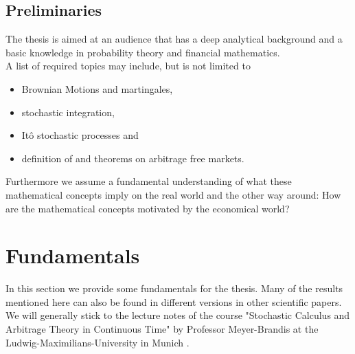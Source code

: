 \documentclass[12pt]{article}
\begin{document}
	
	\subsection{Preliminaries}
	The thesis is aimed at an audience that has a deep analytical background and a basic knowledge in probability theory and financial mathematics.\\
	A list of required topics may include, but is not limited to
	\begin{itemize}
		\item Brownian Motions and martingales,
		\item stochastic integration,
		\item Itô stochastic processes and
		\item definition of and theorems on arbitrage free markets.
	\end{itemize}
	Furthermore we assume a fundamental understanding of what these mathematical concepts imply on the real world and the other way around: How are the mathematical concepts motivated by the economical world?
	
	
	
	
	
	
	
	\pagebreak
	\section{Fundamentals}\label{sec:Fundamentals}
	In this section we provide some fundamentals for the thesis. Many of the results mentioned here can also be found in different versions in other scientific papers. We will generally stick to the lecture notes of the course "Stochastic Calculus and Arbitrage Theory in Continuous Time" by Professor Meyer-Brandis at the Ludwig-Maximilians-University in Munich \cite{fima2Lecture}.
	
\end{document}
